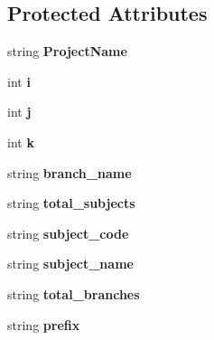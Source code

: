 \subsection*{Protected Attributes}
\begin{DoxyCompactItemize}
\item 
\hypertarget{classHTMLTags_a9ed88cd64186174fe5453bc59b3fbe46}{string {\bfseries Project\-Name}}\label{classHTMLTags_a9ed88cd64186174fe5453bc59b3fbe46}

\item 
\hypertarget{classHTMLTags_a571b1d2b580555251d0f131086a57677}{int {\bfseries i}}\label{classHTMLTags_a571b1d2b580555251d0f131086a57677}

\item 
\hypertarget{classHTMLTags_a9af17bf120e2c2e3dc8ec7c2ecfb8d90}{int {\bfseries j}}\label{classHTMLTags_a9af17bf120e2c2e3dc8ec7c2ecfb8d90}

\item 
\hypertarget{classHTMLTags_a23b5212cbe6e637c5a15b2ddf0144884}{int {\bfseries k}}\label{classHTMLTags_a23b5212cbe6e637c5a15b2ddf0144884}

\item 
\hypertarget{classHTMLTags_a9906347d29a4256a824e4fb0ecd89f62}{string {\bfseries branch\-\_\-name}}\label{classHTMLTags_a9906347d29a4256a824e4fb0ecd89f62}

\item 
\hypertarget{classHTMLTags_a150314c7c15f317e6600129991d342bb}{string {\bfseries total\-\_\-subjects}}\label{classHTMLTags_a150314c7c15f317e6600129991d342bb}

\item 
\hypertarget{classHTMLTags_acda47c333a94c60172aec7023715e562}{string {\bfseries subject\-\_\-code}}\label{classHTMLTags_acda47c333a94c60172aec7023715e562}

\item 
\hypertarget{classHTMLTags_a2ae76cfc823201fd1043c8939f3c15ab}{string {\bfseries subject\-\_\-name}}\label{classHTMLTags_a2ae76cfc823201fd1043c8939f3c15ab}

\item 
\hypertarget{classHTMLTags_a1987b2f2a9c4bc84fbfc8b1fdf031016}{string {\bfseries total\-\_\-branches}}\label{classHTMLTags_a1987b2f2a9c4bc84fbfc8b1fdf031016}

\item 
\hypertarget{classHTMLTags_a5e3f90482bd76a901ed18ecae9fe9eff}{string {\bfseries prefix}}\label{classHTMLTags_a5e3f90482bd76a901ed18ecae9fe9eff}


\end{DoxyCompactItemize}
